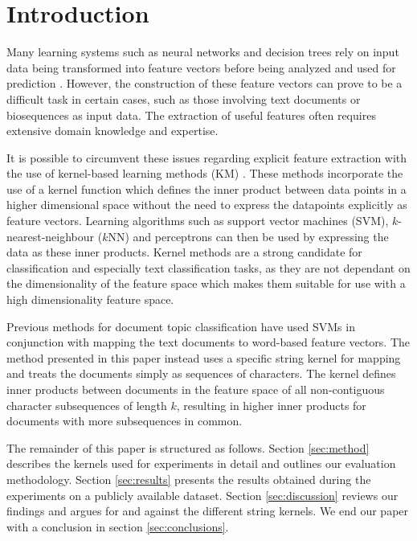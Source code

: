 \section{Introduction} \label{sec:intro}

Many learning systems such as neural networks and decision trees rely on input data being transformed into feature vectors before being analyzed and used for prediction \cite{word2vec, glove}. However, the construction of these feature vectors can prove to be a difficult task in certain cases, such as those involving text documents or biosequences as input data. The extraction of useful features often requires extensive domain knowledge and expertise.

It is possible to circumvent these issues regarding explicit feature extraction with the use of kernel-based learning methods (KM) \cite{vapnik}. These methods incorporate the use of a kernel function which defines the inner product between data points in a higher dimensional space without the need to express the datapoints explicitly as feature vectors. Learning algorithms such as support vector machines (SVM), $k$-nearest-neighbour ($k$NN) and perceptrons can then be used by expressing the data as these inner products. Kernel methods are a strong candidate for classification and especially text classification tasks, as they are not dependant on the dimensionality of the feature space which makes them suitable for use with a high dimensionality feature space.

Previous methods for document topic classification \cite{wk} have used SVMs in conjunction with mapping the text documents to word-based feature vectors. The method presented in this paper instead uses a specific string kernel for mapping and treats the documents simply as sequences of characters. The kernel defines inner products between documents in the feature space of all non-contiguous character subsequences of length $k$, resulting in higher inner products for documents with more subsequences in common.

The remainder of this paper is structured as follows. Section \ref{sec:method} describes the kernels used for experiments in detail and outlines our evaluation methodology. Section \ref{sec:results} presents the results obtained during the experiments on a publicly available dataset. Section \ref{sec:discussion} reviews our findings and argues for and against the different string kernels. We end our paper with a conclusion in section \ref{sec:conclusions}.
